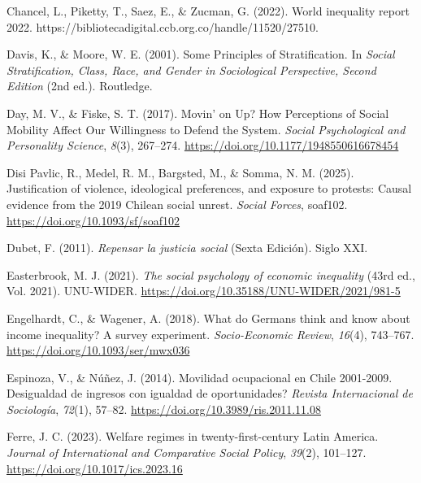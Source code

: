 \documentclass[
  12pt,
]{article}
\newlength{\cslhangindent}
\newenvironment{CSLReferences}[2] %
 {\begin{list}{}{%
  \setlength{\itemindent}{0pt}
  \setlength{\leftmargin}{0pt}
  \setlength{\parsep}{0pt}
  \ifodd #1
   \setlength{\leftmargin}{\cslhangindent}
   \setlength{\itemindent}{-1\cslhangindent}
  \fi
  \setlength{\itemsep}{#2\baselineskip}}}
 {\end{list}}
\begin{document}
\begin{CSLReferences}{1}{0}
Chancel, L., Piketty, T., Saez, E., \& Zucman, G. (2022). World
inequality report 2022.
https://bibliotecadigital.ccb.org.co/handle/11520/27510.

Davis, K., \& Moore, W. E. (2001). Some {Principles} of
{Stratification}. In \emph{Social {Stratification}, {Class}, {Race}, and
{Gender} in {Sociological Perspective}, {Second Edition}} (2nd ed.).
Routledge.

Day, M. V., \& Fiske, S. T. (2017). Movin' on {Up}? {How Perceptions} of
{Social Mobility Affect Our Willingness} to {Defend} the {System}.
\emph{Social Psychological and Personality Science}, \emph{8}(3),
267--274. \url{https://doi.org/10.1177/1948550616678454}

Disi Pavlic, R., Medel, R. M., Bargsted, M., \& Somma, N. M. (2025).
Justification of violence, ideological preferences, and exposure to
protests: Causal evidence from the 2019 {Chilean} social unrest.
\emph{Social Forces}, soaf102. \url{https://doi.org/10.1093/sf/soaf102}

Dubet, F. (2011). \emph{{Repensar la justicia social}} (Sexta
Edici{ó}n). Siglo XXI.

Easterbrook, M. J. (2021). \emph{The social psychology of economic
inequality} (43rd ed., Vol. 2021). UNU-WIDER.
\url{https://doi.org/10.35188/UNU-WIDER/2021/981-5}

Engelhardt, C., \& Wagener, A. (2018). What do {Germans} think and know
about income inequality? {A} survey experiment. \emph{Socio-Economic
Review}, \emph{16}(4), 743--767.
\url{https://doi.org/10.1093/ser/mwx036}

Espinoza, V., \& Núñez, J. (2014). Movilidad ocupacional en {Chile}
2001-2009. {\textquestiondown}{Desigualdad} de ingresos con igualdad de
oportunidades? \emph{Revista Internacional de Sociolog{í}a},
\emph{72}(1), 57--82. \url{https://doi.org/10.3989/ris.2011.11.08}

Ferre, J. C. (2023). Welfare regimes in twenty-first-century {Latin
America}. \emph{Journal of International and Comparative Social Policy},
\emph{39}(2), 101--127. \url{https://doi.org/10.1017/ics.2023.16}


\end{CSLReferences}
\end{document}
